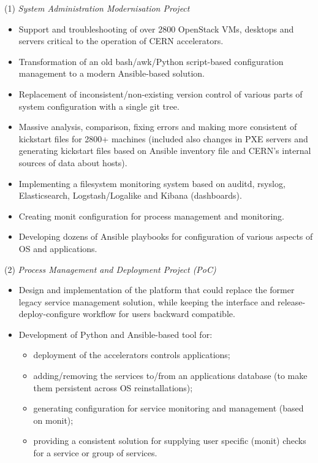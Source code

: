 \documentclass[$fontsize$, a4paper]{article}
\begin{document}
\vspace{10pt}
(1) \emph{System Administration Modernisation Project}
\begin{itemize}
  \item Support and troubleshooting of over 2800 OpenStack VMs, desktops and servers critical to the operation of CERN accelerators.
  \item Transformation of an old bash/awk/Python script-based configuration management to a modern Ansible-based solution.
  \item Replacement of inconsistent/non-existing version control of various parts of system configuration with a single git tree.
  \item Massive analysis, comparison, fixing errors and making more consistent of kickstart files for 2800+ machines (included also changes in PXE servers and generating kickstart files based on Ansible inventory file and CERN's internal sources of data about hosts).
  \item Implementing a filesystem monitoring system based on auditd, rsyslog, Elasticsearch, Logstash/Logalike and Kibana (dashboards).
  \item Creating monit configuration for process management and monitoring.
  \item Developing dozens of Ansible playbooks for configuration of various aspects of OS and applications.
\end{itemize}

\pagebreak
(2) \emph{Process Management and Deployment Project (PoC)}
\begin{itemize}
  \item Design and implementation of the platform that could replace the former legacy service management solution,
  while keeping the interface and release-deploy-configure workflow for users backward compatible.
  \item Development of Python and Ansible-based tool for:
  \begin{itemize}
    \item deployment of the accelerators controls applications;
    \item adding/removing the services to/from an applications database (to make them persistent across OS reinstallations);
    \item generating configuration for service monitoring and management (based on monit);
    \item providing a consistent solution for supplying user specific (monit) checks for a service or group of services.
  \end{itemize}
\end{itemize}
\end{document}
